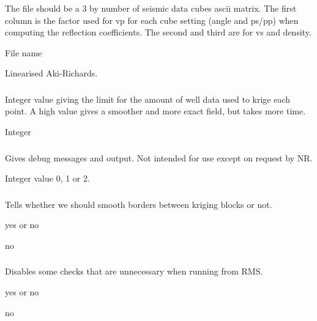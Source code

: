 \subsubsection{}
\slist
   \item \Description The file should be a 3 by  number of seismic data cubes ascii matrix. The first column is the factor used for vp for each cube setting (angle and ps/pp) when computing the reflection coefficients. The second and third are for vs and density.
   \item \Argument File name
   \item \Default Linearised Aki-Richards.
 \elist

\subsubsection{}
 \slist
   \item \Description Integer value giving the limit for the amount of well data used to krige each point. A high value gives a smoother and more exact field, but takes more time.
   \item \Argument Integer
   \item {}
 \elist

\subsubsection{}
 \slist
   \item \Description Gives debug messages and output. Not intended for use except on request by NR.
   \item \Argument Integer value 0, 1 or 2.
   \item {}
 \elist

\subsubsection{}
\slist
   \item \Description Tells whether we should smooth borders between kriging blocks or not.
   \item \Argument yes or no
   \item \Default no
\elist

\subsubsection{}
\slist
   \item \Description Disables some checks that are unnecessary when
   running from RMS.
   \item \Argument yes or no
   \item \Default no
\elist

